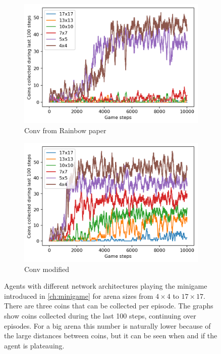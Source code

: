 \begin{figure}
\begin{subfigure}[b]{0.48\linewidth}
    	\includegraphics[width=\linewidth]{images/minigame-conv8-4-3-arch.png}
    \caption{Conv from Rainbow paper\cite{Hessel2018RainbowCI}}
    \label{fig:network-conv843}
  \end{subfigure}
  \quad
  \begin{subfigure}[b]{0.48\linewidth}
    \centering
      \includegraphics[width=\linewidth]{images/minigame-conv1-4-3-arch.png}
    \caption{Conv modified}
    \label{fig:network-conv143}
  \end{subfigure}
  \caption{Agents with different network architectures playing the minigame introduced in \ref{ch:minigame} for arena sizes from $4\times4$ to $17\times17$. There are three coins that can be collected per episode. The graphs show coins collected during the last 100 steps, continuing over episodes. For a big arena this number is naturally lower because of the large distances between coins, but it can be seen when and if the agent is plateauing.}
  \label{fig:networks}
\end{figure}

